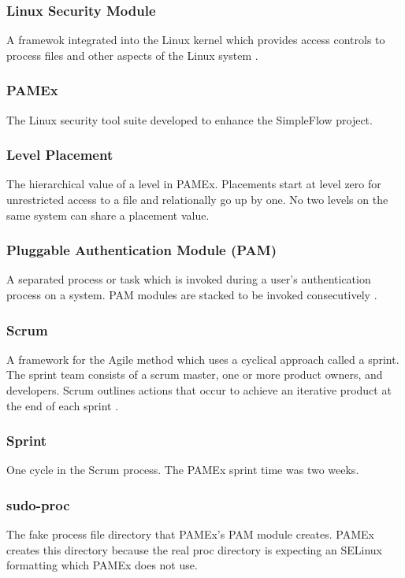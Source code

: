 \subsubsection*{Linux Security Module}

A framewok integrated into the Linux kernel which provides access controls to process files and other aspects of the Linux system \cite{kerneldocs}.

\subsubsection*{PAMEx}

The Linux security tool suite developed to enhance the SimpleFlow project. 

\subsubsection*{Level Placement}

The hierarchical value of a level in PAMEx. Placements start at level zero for unrestricted access to a file and relationally go up by one. No two levels on the same system can share a placement value. 

\subsubsection*{Pluggable Authentication Module (PAM)}

A separated process or task which is invoked during a user's authentication process on a system. PAM modules are stacked to be invoked consecutively \cite{lauber}.

\subsubsection*{Scrum}

A framework for the Agile method which uses a cyclical approach called a sprint. The sprint team consists of a scrum master, one or more product owners, and developers. Scrum outlines actions that occur to achieve an iterative product at the end of each sprint \cite{scrumorg}.

\subsubsection*{Sprint}

One cycle in the Scrum process. The PAMEx sprint time was two weeks.

\subsubsection*{sudo-proc}
The fake process file directory that PAMEx's PAM module creates. PAMEx creates this directory because the real proc directory is expecting an SELinux formatting which PAMEx does not use.

